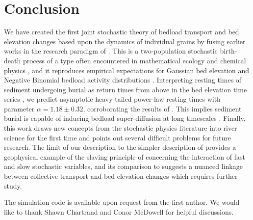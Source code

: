 \documentclass[draft]{agujournal2018}
\begin{document}
\section{Conclusion}

We have created the first joint stochastic theory of bedload transport and bed elevation changes based upon the dynamics of individual grains by fusing earlier works in the research paradigm of \citet{Einstein1937}.
This is a two-population stochastic birth-death process of a type often encountered in mathematical ecology \citep[e.g.][]{Pielou1977} and chemical physics \citep[e.g.][]{Gardiner1983}, and it reproduces empirical expectations for Gaussian bed elevation and Negative Binomial bedload activity distributions \citep[e.g.][]{Wong2007,Ancey2008}.
Interpreting resting times of sediment undergoing burial as return times from above in the bed elevation time series \citep[e.g.][]{Voepel2013}, we predict asymptotic heavy-tailed power-law resting times with parameter $\alpha = 1.18 \pm 0.32$, corroborating the results of \citet{Martin2014}.
This implies sediment burial is capable of inducing bedload super-diffusion at long timescales \citep[e.g.][]{Phillip2013}.
Finally, this work draws new concepts from the stochastic physics literature into river science for the first time and points out several difficult problems for future research.
The limit of our description to the simpler description of \citet{Martin2014} provides a geophysical example of the slaving principle of \citet{Haken1983} concerning the interaction of fast and slow stochastic variables, and its comparison to \citet{Ancey2008} suggests a nuanced linkage between collective transport and bed elevation changes which requires further study.


\acknowledgments
The simulation code is available upon request from the first author. We would like to thank Shawn Chartrand and Conor McDowell for helpful discussions. 


\end{document}
